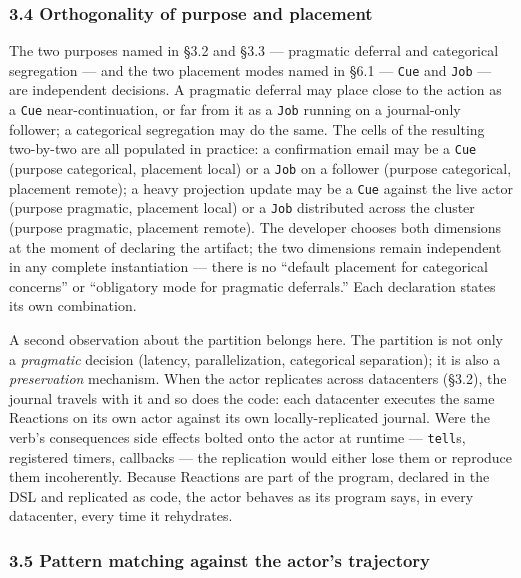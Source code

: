 \documentclass[
]{article}
\let\origtexttt\texttt%
\renewcommand{\texttt}[1]{\origtexttt{\seqsplit{#1}}}%
\let\texttt\origtexttt%
\begin{document}
\subsubsection{3.4 Orthogonality of purpose and
placement}\label{orthogonality-of-purpose-and-placement}

The two purposes named in §3.2 and §3.3 --- pragmatic deferral and
categorical segregation --- and the two placement modes named in §6.1
--- \texttt{Cue} and \texttt{Job} --- are independent decisions. A
pragmatic deferral may place close to the action as a \texttt{Cue}
near-continuation, or far from it as a \texttt{Job} running on a
journal-only follower; a categorical segregation may do the same. The
cells of the resulting two-by-two are all populated in practice: a
confirmation email may be a \texttt{Cue} (purpose categorical, placement
local) or a \texttt{Job} on a follower (purpose categorical, placement
remote); a heavy projection update may be a \texttt{Cue} against the
live actor (purpose pragmatic, placement local) or a \texttt{Job}
distributed across the cluster (purpose pragmatic, placement remote).
The developer chooses both dimensions at the moment of declaring the
artifact; the two dimensions remain independent in any complete
instantiation --- there is no ``default placement for categorical
concerns'' or ``obligatory mode for pragmatic deferrals.'' Each
declaration states its own combination.

A second observation about the partition belongs here. The partition is
not only a \emph{pragmatic} decision (latency, parallelization,
categorical separation); it is also a \emph{preservation} mechanism.
When the actor replicates across datacenters (§3.2), the journal travels
with it and so does the code: each datacenter executes the same
Reactions on its own actor against its own locally-replicated journal.
Were the verb's consequences side effects bolted onto the actor at
runtime --- \texttt{tell}s, registered timers, callbacks --- the
replication would either lose them or reproduce them incoherently.
Because Reactions are part of the program, declared in the DSL and
replicated as code, the actor behaves as its program says, in every
datacenter, every time it rehydrates.

\subsubsection{3.5 Pattern matching against the actor's
trajectory}\label{pattern-matching-against-the-actors-trajectory}
\end{document}
